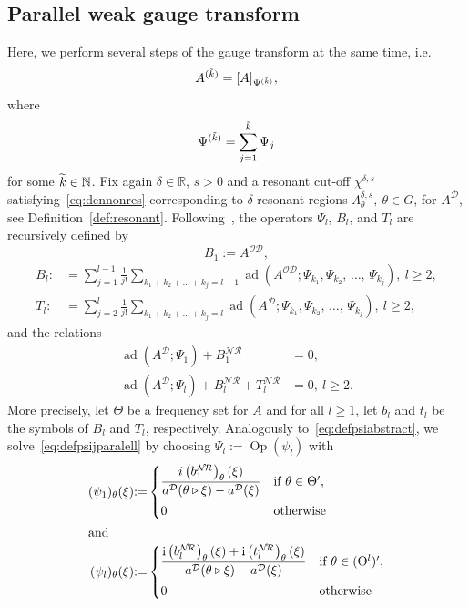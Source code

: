 \documentclass[AHL,Unicode,longabstracts,published]{cedram}
\DeclareMathOperator{\ad}{ad}
\DeclareMathOperator{\Op}{Op}
\newcommand{\rmi}{\mathrm{i}}
\newcommand{\R}{\mathbb R}
\newcommand{\N}{\mathbb N}
\newcommand{\CD}{\mathcal{D}}
\newcommand{\CN}{\mathcal{N}}
\newcommand{\CO}{\mathcal{O}}
\newcommand{\CR}{\mathcal{R}}
\newcommand{\COD}{{\CO\CD}}
\newcommand{\CNR}{{\CN\!\CR}}
\newcommand{\rco}{\chi}
\newcommand{\act}{\triangleright}
\let\oldtilde\tilde
\renewcommand*{\tilde}[1]{\mathchoice{\widetilde{#1}}{\widetilde{#1}}{\oldtilde{#1}}{\oldtilde{#1}}}
\begin{document}
\subsection{Parallel weak gauge transform} Here, we perform several steps of the gauge transform at the same time, i.e.
\begin{equation}
A^{(\tilde k)}=[A]_{\Psi^{(\tilde{k})}},
\end{equation}
where
\begin{equation}
\Psi^{(\tilde k)}=\sum\limits_{j=1}^{\tilde{k}}\Psi_j
\end{equation}
for some $\tilde{k}\in\N$. Fix again $\delta\in\R$, $s>0$ and a resonant cut-off $\rco^{\delta,s}$ satisfying~\eqref{eq:dennonres} corresponding to $\delta$-resonant regions $\Lambda_\theta^{\delta,s},\ \theta\in G$, for $A^{\CD}$, see Definition~\ref{def:resonant}. Following~\cite[Section~9]{ParSht2012}, the operators $\Psi_l$, $B_l$, and $T_l$ are recursively defined by
\begin{equation}\label{eq:defb1}
B_1:=A^\COD,
\end{equation}
\begin{equation}\label{eq:defbltl}
\begin{split}
B_l:&=\sum\limits_{j=1}^{l-1}\frac{1}{j!}\sum\limits_{k_1+k_2+\dots +k_j=l-1}\ad\left(A^\COD;\Psi_{k_1},\Psi_{k_2},\,\dots,\,\Psi_{k_j}\right),\ l\geq 2,\\
T_l:&=\sum\limits_{j=2}^l\frac{1}{j!}\sum\limits_{k_1+k_2+\dots +k_j=l}\ad\left(A^\CD;\Psi_{k_1},\Psi_{k_2},\,\dots,\,\Psi_{k_j}\right),\ l\geq 2,
\end{split}
\end{equation}
and the relations
\begin{equation}\label{eq:defpsijparalell}
\begin{split}
\ad\left(A^\CD;\Psi_1\right)+B_1^{\CNR}&=0,\\
\ad\left(A^\CD;\Psi_l\right)+B_l^{\CNR}+T_l^{\CNR}&=0, \ l\geq 2.
\end{split}
\end{equation}
More precisely, let $\Theta$ be a frequency set for $A$ and for all $l\geq 1$, let $b_l$ and $t_l$ be the symbols of $B_l$ and $T_l$, respectively. Analogously to~\eqref{eq:defpsiabstract}, we solve~\eqref{eq:defpsijparalell} by choosing $\Psi_l:=\Op(\psi_l)$ with
\begin{align}
(\psi_1)_\theta(\xi)&{:=}
\begin{cases}\dfrac{i\left(b_1^\CNR\right)_\theta(\xi)}{a^\CD(\theta\act\xi)-a^\CD(\xi)}&
\text{if } \theta\in\Theta',\\[2ex] 0 & \text{otherwise}
\end{cases}
\\
\intertext{and}
(\psi_l)_\theta(\xi) &{:=}
\begin{cases}\dfrac{\rmi\left(b_l^\CNR\right)_\theta(\xi)+\rmi\left(t_l^{\CNR}\right)_\theta(\xi)}{a^\CD(\theta\act\xi)-a^\CD(\xi)}&
\text{if } \theta\in(\Theta^l)',\\[2ex] 0 & \text{otherwise}
\end{cases}
\end{align}
\end{document}
